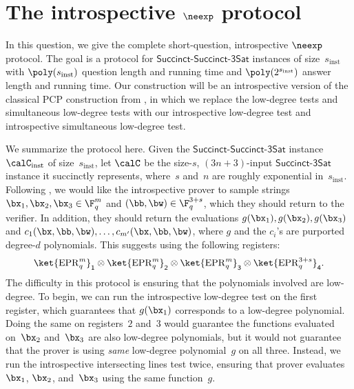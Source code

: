 \documentclass[11pt]{article}
\newcommand{\succinct}{\mathsf{Succinct}\text{-}\mathsf{3Sat}}
\newcommand{\succinctsquared}{\mathsf{Succinct}\text{-}\mathsf{Succinct}\text{-}\mathsf{3Sat}}
\newcommand{\reg}[1]{{\mathsf{#1}}}
\begin{document}

\section{The introspective $\neexp$ protocol}\label{sec:big-neexp-protocol}

In this question, we give the complete short-question, introspective $\neexp$ protocol.
The goal is a protocol for $\succinctsquared$ instances of size~$s_{\mathrm{inst}}$
with $\poly(s_{\mathrm{inst}})$ question length and running time and $\poly(2^{s_{\mathrm{inst}}})$ answer length and running time.
Our construction will be an introspective version of the classical PCP construction from ,
in which we replace the low-degree tests and simultaneous low-degree tests
with our introspective low-degree test and introspective simultaneous low-degree test.

We summarize the protocol here.
Given the $\succinctsquared$ instance~$\calC_{\mathrm{inst}}$
of size~$s_{\mathrm{inst}}$,
let $\calC$ be the size-$s$, $(3n+3)$-input $\succinct$ instance it succinctly represents,
where~$s$ and~$n$ are roughly exponential in~$s_{\mathrm{inst}}$.
Following ,
we would like the introspective prover to sample strings $\bx_1, \bx_2, \bx_3 \in \F_q^m$ and $(\bb, \bw) \in \F_q^{3+s}$,
which they should return to the verifier.
In addition, they should return the evaluations $g(\bx_1), g(\bx_2), g(\bx_3)$ and $c_1(\bx, \bb, \bw), \ldots, c_{m'}(\bx, \bb, \bw)$,
where $g$ and the $c_i$'s are purported degree-$d$ polynomials.
This suggests using the following registers:
\begin{equation*}
\ket{\mathrm{EPR}_q^m}_{\reg{1}}
\otimes \ket{\mathrm{EPR}_q^m}_{\reg{2}}
\otimes \ket{\mathrm{EPR}_q^m}_{\reg{3}}
\otimes \ket{\mathrm{EPR}_q^{3+s}}_{\reg{4}}.
\end{equation*}
The difficulty in this protocol is ensuring that the polynomials involved are low-degree.
To begin, we can run the introspective low-degree test on the first register,
which guarantees that $g(\bx_1)$ corresponds to a low-degree polynomial. 
Doing the same on registers~$2$ and~$3$ would guarantee
the functions evaluated on~$\bx_2$ and~$\bx_3$ are also low-degree polynomials,
but it would not guarantee that the prover is using \emph{same} low-degree polynomial~$g$ on all three.
Instead, we run the introspective intersecting lines test twice,
ensuring that prover evaluates~$\bx_1$, $\bx_2$, and~$\bx_3$ using the same function~$g$.
\end{document}
